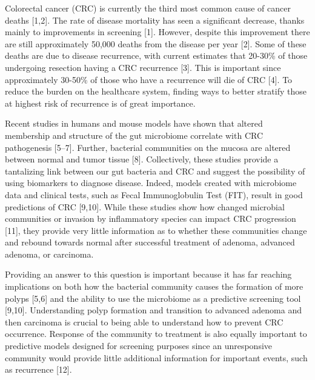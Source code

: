 \documentclass[12pt,]{article}
\begin{document}
Colorectal cancer (CRC) is currently the third most common cause of
cancer deaths {[}1,2{]}. The rate of disease mortality has seen a
significant decrease, thanks mainly to improvements in screening
{[}1{]}. However, despite this improvement there are still approximately
50,000 deaths from the disease per year {[}2{]}. Some of these deaths
are due to disease recurrence, with current estimates that 20-30\% of
those undergoing resection having a CRC recurrence {[}3{]}. This is
important since approximately 30-50\% of those who have a recurrence
will die of CRC {[}4{]}. To reduce the burden on the healthcare system,
finding ways to better stratify those at highest risk of recurrence is
of great importance.

Recent studies in humans and mouse models have shown that altered
membership and structure of the gut microbiome correlate with CRC
pathogenesis {[}5--7{]}. Further, bacterial communities on the mucosa
are altered between normal and tumor tissue {[}8{]}. Collectively, these
studies provide a tantalizing link between our gut bacteria and CRC and
suggest the possibility of using biomarkers to diagnose disease. Indeed,
models created with microbiome data and clinical tests, such as Fecal
Immunoglobulin Test (FIT), result in good predictions of CRC {[}9,10{]}.
While these studies show how changed microbial communities or invasion
by inflammatory species can impact CRC progression {[}11{]}, they
provide very little information as to whether these communities change
and rebound towards normal after successful treatment of adenoma,
advanced adenoma, or carcinoma.

Providing an answer to this question is important because it has far
reaching implications on both how the bacterial community causes the
formation of more polyps {[}5,6{]} and the ability to use the microbiome
as a predictive screening tool {[}9,10{]}. Understanding polyp formation
and transition to advanced adenoma and then carcinoma is crucial to
being able to understand how to prevent CRC occurrence. Response of the
community to treatment is also equally important to predictive models
designed for screening purposes since an unresponsive community would
provide little additional information for important events, such as
recurrence {[}12{]}.
\end{document}
